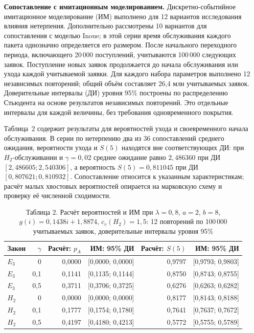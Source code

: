 \noindent\textbf{Сопоставление с имитационным моделированием.}
Дискретно-событийное имитационное моделирование (ИМ) выполнено для 12 вариантов исследования влияния нетерпения. Дополнительно рассмотрены 10 вариантов для сопоставления с моделью Inoue; в этой серии время обслуживания каждого пакета однозначно определяется его размером. После начального переходного периода, включающего 20\,000 поступлений, учитываются 100\,000 следующих заявок. Поступление новых заявок продолжается до начала обслуживания или ухода каждой учитываемой заявки. Для каждого набора параметров выполнено 12 независимых повторений; общий объём составляет 26,4 млн учитываемых заявок. Доверительные интервалы (ДИ) уровня 95\% построены по распределению Стьюдента на основе результатов независимых повторений. Это отдельные интервалы для каждой величины, без требования одновременного покрытия.

Таблица~2 содержит результаты для вероятностей ухода и своевременного начала обслуживания. В серии по нетерпению два из 36 сопоставлений среднего ожидания, вероятности ухода и $S(5)$ находятся вне соответствующих ДИ: при $H_2$-обслуживании и $\gamma=0{,}02$ среднее ожидание равно $2{,}486360$ при ДИ $[2{,}486605;2{,}540306]$, а вероятность $S(5)=0{,}811045$ при ДИ $[0{,}807621;0{,}810932]$. Сопоставление относится к указанным характеристикам; расчёт малых хвостовых вероятностей опирается на марковскую схему и проверку её численной сходимости.

\begin{table}[htbp]\centering\small
\caption{Таблица 2. Расчёт вероятностей и ИМ при $\lambda=0{,}8$, $a=2$, $b=8$, $g(i)=0{,}1438i+1{,}8874$, $c_v(H_2)=1{,}5$: 12 повторений по 100\,000 учитываемых заявок, доверительные интервалы уровня 95\%}
\begin{tabular}{lrrrrr}
\hline
Закон & $\gamma$ & Расчёт: $p_A$ & ИМ: 95\% ДИ & Расчёт: $S(5)$ & ИМ: 95\% ДИ \\
\hline
$E_3$ & 0 & 0,0000 & [0,0000; 0,0000] & 0,9797 & [0,9793; 0,9803] \\
$E_3$ & 0,1 & 0,1141 & [0,1135; 0,1144] & 0,8750 & [0,8743; 0,8755] \\
$E_3$ & 0,5 & 0,3711 & [0,3706; 0,3725] & 0,6276 & [0,6263; 0,6282] \\
$H_2$ & 0 & 0,0000 & [0,0000; 0,0000] & 0,8177 & [0,8143; 0,8188] \\
$H_2$ & 0,1 & 0,1777 & [0,1754; 0,1780] & 0,7641 & [0,7637; 0,7672] \\
$H_2$ & 0,5 & 0,4197 & [0,4180; 0,4213] & 0,5772 & [0,5755; 0,5789] \\
\hline
\end{tabular}

\end{table}

